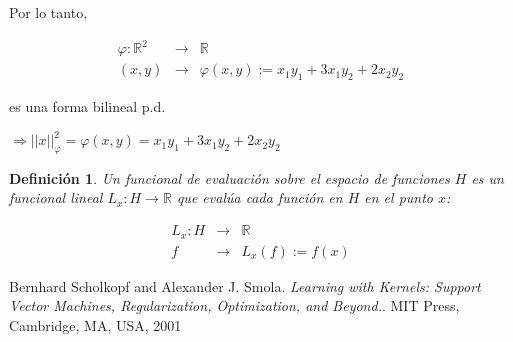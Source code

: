 \documentclass[12pt]{article}
\newtheorem*{mydef}{Definición}
\begin{document}
Por lo tanto,

\begin{eqnarray*}
\varphi: \mathbb{R}^2  &\rightarrow & \mathbb{R} \\
  (x,y)&\rightarrow & \varphi(x,y) := x_1y_1 + 3x_1y_2 +  2x_2y_2 
\end{eqnarray*}

es una forma bilineal p.d. 

$\Rightarrow ||x||_{\varphi}^2 = \varphi(x,y)=x_1 y_1 + 3x_1 y_2 + 2 x_2 y_2$

\begin{mydef}
Un funcional de evaluación sobre el espacio de funciones $H$ es un funcional lineal $L_x: H \rightarrow \mathbb{R}$ que evalúa cada función en $H$ en el punto $x$:

\begin{eqnarray*}
L_x: H &\rightarrow &\mathbb{R} \\
 f &\rightarrow & L_x(f):= f(x)
\end{eqnarray*}
\end{mydef}



\begin{thebibliography}{9}

  Bernhard Scholkopf and Alexander J. Smola. 
   \emph{Learning with Kernels: Support Vector Machines, Regularization, Optimization, and Beyond.}.
  MIT Press, Cambridge, MA, USA, 
  2001
  
\end{thebibliography}
\end{document}
